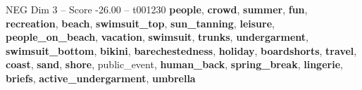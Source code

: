 \begin{textsample}{NEG Dim 3 – Score -26.00 – t001230}  \label{ex:f3_neg_011}
\textbf{people}, \textbf{crowd}, \textbf{summer}, \textbf{fun}, \textbf{recreation}, \textbf{beach}, \textbf{swimsuit\_top}, \textbf{sun\_tanning}, \textbf{leisure}, \textbf{people\_on\_beach}, \textbf{vacation}, \textbf{swimsuit}, \textbf{trunks}, \textbf{undergarment}, \textbf{swimsuit\_bottom}, \textbf{bikini}, \textbf{barechestedness}, \textbf{holiday}, \textbf{boardshorts}, \textbf{travel}, \textbf{coast}, \textbf{sand}, \textbf{shore}, public\_event, \textbf{human\_back}, \textbf{spring\_break}, \textbf{lingerie}, \textbf{briefs}, \textbf{active\_undergarment}, \textbf{umbrella}

\end{textsample}
